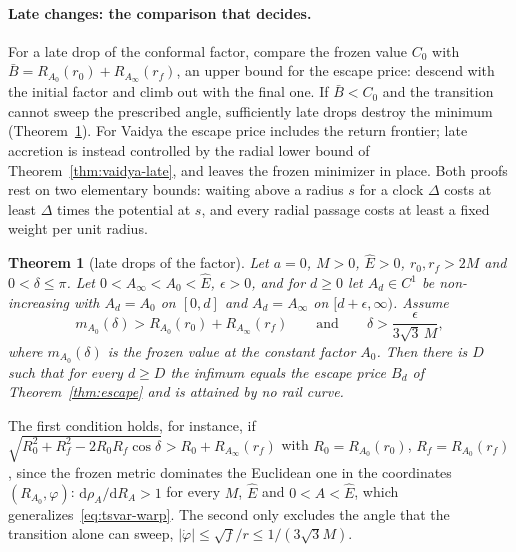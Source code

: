 \documentclass[aip,jmp,amsmath,amssymb,reprint]{revtex4-2}
\newcommand{\Ehat}{\hat E}
\newcommand{\dd}{\mathrm{d}}
\theoremstyle{plain}
\newtheorem{theorem}{Theorem}
\theoremstyle{definition}
\begin{document}
\paragraph{Late changes: the comparison that decides.}
For a late drop of the conformal factor, compare the frozen value $C_0$ with
$\bar B=R_{A_0}(r_0)+R_{A_\infty}(r_f)$, an upper bound for the escape price: descend with the initial factor and
climb out with the final one. If $\bar B<C_0$ and the transition cannot sweep the prescribed angle,
sufficiently late drops destroy the minimum (Theorem~\ref{thm:tau-var-late}). For Vaidya the escape price
includes the return frontier; late accretion is instead controlled by the radial lower bound of
Theorem~\ref{thm:vaidya-late}, and leaves the frozen minimizer in place. Both proofs rest on two elementary bounds:
waiting above a radius $s$ for a clock $\Delta$ costs at least $\Delta$ times the potential at $s$, and every
radial passage costs at least a fixed weight per unit radius.

\begin{theorem}[late drops of the factor]\label{thm:tau-var-late}
Let $a=0$, $M>0$, $\Ehat>0$, $r_0,r_f>2M$ and $0<\delta\le\pi$. Let $0<A_\infty<A_0<\Ehat$, $\epsilon>0$, and for
$d\ge0$ let $A_d\in C^1$ be non-increasing with $A_d=A_0$ on $[0,d]$ and $A_d=A_\infty$ on $[d+\epsilon,\infty)$.
Assume
\begin{equation}
  m_{A_0}(\delta)>R_{A_0}(r_0)+R_{A_\infty}(r_f)
  \qquad\text{and}\qquad
  \delta>\frac{\epsilon}{3\sqrt3\,M},
  \label{eq:late-drop-hyp}
\end{equation}
where $m_{A_0}(\delta)$ is the frozen value at the constant factor $A_0$. Then there is $D$ such that for every
$d\ge D$ the infimum equals the escape price $B_d$ of Theorem~\ref{thm:escape} and is attained by no rail
curve.
\end{theorem}

The first condition holds, for instance, if
$\sqrt{R_0^2+R_f^2-2R_0R_f\cos\delta}>R_0+R_{A_\infty}(r_f)$ with $R_0=R_{A_0}(r_0)$, $R_f=R_{A_0}(r_f)$, since the
frozen metric dominates the Euclidean one in the coordinates $(R_{A_0},\varphi)$: $\dd\rho_A/\dd R_A>1$ for every
$M$, $\Ehat$ and $0<A<\Ehat$, which generalizes~\eqref{eq:tsvar-warp}.
The second only excludes the angle that the transition alone can sweep, $|\dot\varphi|\le\sqrt f/r\le1/(3\sqrt3M)$.
\end{document}

